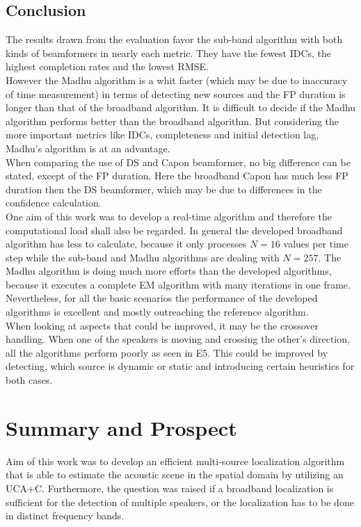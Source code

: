 \section{Conclusion}
\label{sec:conclusion}

The results drawn from the evaluation favor the sub-band algorithm with both kinds of beamformers in nearly each metric. They have the fewest \aclp{IDC}, the highest completion rates and the lowest \acl{RMSE}.\\
 However the Madhu algorithm is a whit faster (which may be due to inaccuracy of time measurement) in terms of detecting new sources and the \acl{FP} duration is longer than that of the broadband algorithm. It is difficult to decide if the Madhu algorithm performs better than the broadband algorithm. But considering the more important metrics like \acp{IDC}, completeness and initial detection lag, Madhu's algorithm is at an advantage. \\
When comparing the use of \acl{DS} and Capon beamformer, no big difference can be stated, except of the \ac{FP} duration. Here the broadband Capon has much less \ac{FP} duration then the \ac{DS} beamformer, which may be due to differences in the confidence calculation.\\
One aim of this work was to develop a real-time algorithm and therefore the computational load shall also be regarded. In general the developed broadband algorithm has less to calculate, because it only processes $N=16$ values per time step while the sub-band and Madhu algorithms are dealing with $N=257$. The Madhu algorithm is doing much more efforts than the developed algorithms, because it executes a complete \acl{EM} algorithm with many iterations in one frame. Nevertheless, for all the basic scenarios the performance of the developed algorithms is excellent and mostly outreaching the reference algorithm.\\
When looking at aspects that could be improved, it may be the crossover handling. When one of the speakers is moving and crossing the other's direction, all the algorithms perform poorly as seen in E5. This could be improved by detecting, which source is dynamic or static and introducing certain heuristics for both cases.\\


\chapter{Summary and Prospect}
\label{chap:Summary}
Aim of this work was to develop an efficient multi-source localization algorithm that is able to estimate the acoustic scene in the spatial domain by utilizing an \acl{UCA+C}. Furthermore, the question was raised if a broadband localization is sufficient for the detection of multiple speakers, or the localization has to be done in distinct frequency bands.\\

